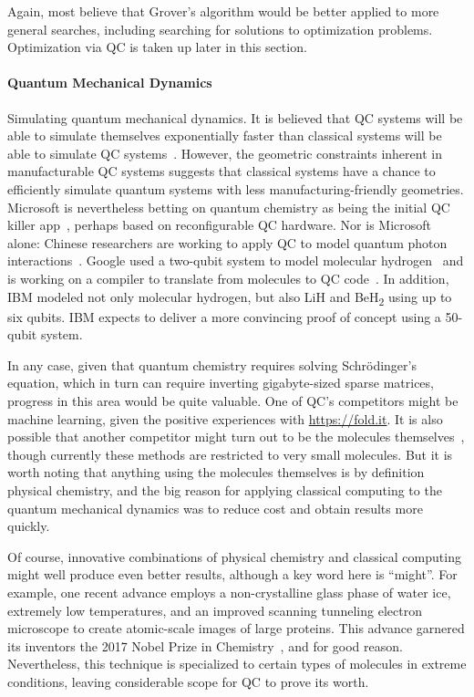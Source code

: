 Again, most believe that Grover's algorithm would be better applied to
more general searches, including searching for solutions to optimization
problems.
Optimization via QC is taken up later in this section.

\paragraph{Quantum Mechanical Dynamics}
\label{sec:future:Quantum Mechanical Dynamics}

Simulating quantum mechanical dynamics.
It is believed that QC systems will be able to simulate themselves
exponentially faster than classical systems will be able to
simulate QC systems~\cite{Feynman1982}.
However, the geometric constraints inherent in manufacturable
QC systems suggests that classical systems have a chance
to efficiently simulate quantum systems with less
manufacturing-friendly geometries.
Microsoft is nevertheless betting on quantum chemistry as being
the initial QC killer app~\cite{TomSimonite2017QC-MS-Chemistry},
perhaps based on reconfigurable QC hardware.
Nor is Microsoft alone: Chinese researchers are working to apply
QC to model quantum photon interactions~\cite{StephenChen2017ChinaQC}.
Google used a two-qubit system to model molecular
hydrogen~\cite{RichardChirgwin2016GoogleQC} and is working on a
compiler to translate from molecules to QC
code~\cite{RichardChirgwin2017GoogleQC}.
In addition, IBM modeled not only molecular hydrogen, but also
LiH and BeH\textsubscript{2} using up to six qubits.
IBM expects to deliver a more convincing proof of concept using a
50-qubit system.

In any case, given that quantum chemistry requires solving
Schr\"{o}dinger's equation, which in turn can require inverting
gigabyte-sized sparse matrices, progress in this area would
be quite valuable.
One of QC's competitors might be machine learning, given the positive
experiences with \url{https://fold.it}.
It is also possible that another competitor might turn out to be the
molecules themselves~\cite{Chin-wenChou2017ManipulateMolecule}, though
currently these methods are restricted to very small molecules.
But it is worth noting that anything using the molecules themselves
is by definition physical chemistry, and the big reason for applying
classical computing to the quantum mechanical dynamics was to reduce
cost and obtain results more quickly.

Of course, innovative combinations of physical chemistry and
classical computing might well produce even better results,
although a key word here is ``might''.
For example, one recent advance employs a non-crystalline glass phase
of water ice, extremely low temperatures, and an improved scanning
tunneling electron microscope to create atomic-scale images of
large proteins.
This advance garnered its inventors the 2017 Nobel Prize in
Chemistry~\cite{NobelPrizeChemistry2017,JohnTimmer2017ChemistryNobel},
and for good reason.
Nevertheless, this technique is specialized to certain types of molecules
in extreme conditions, leaving considerable scope for QC to prove
its worth.


